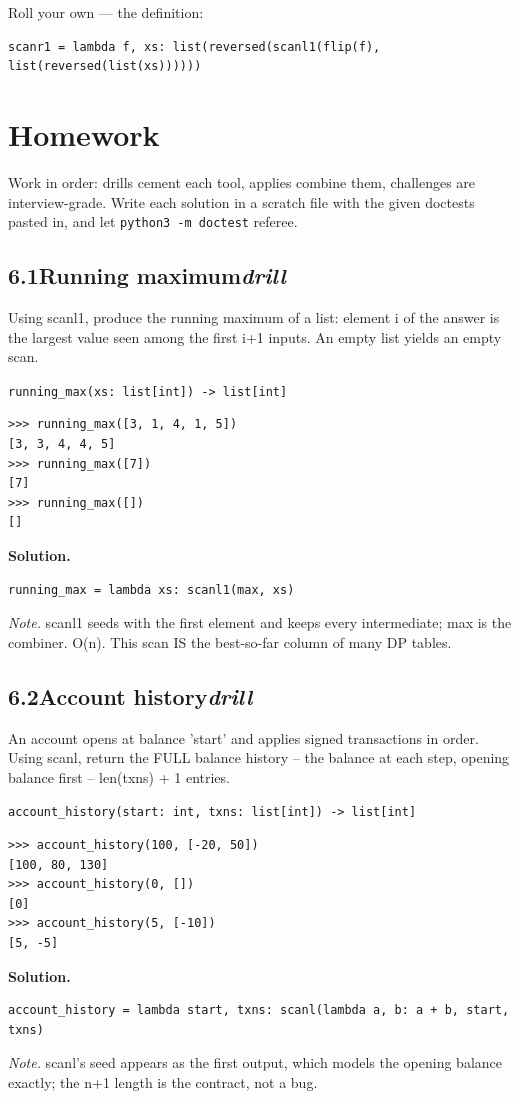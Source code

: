 \documentclass[10pt,letterpaper]{book}
\begin{document}
Roll your own --- the definition:

\begin{lstlisting}[style=ex]
scanr1 = lambda f, xs: list(reversed(scanl1(flip(f), list(reversed(list(xs))))))
\end{lstlisting}

\section{Homework}
Work in order: drills cement each tool, applies combine them,
challenges are interview-grade. Write each solution in a scratch file with
the given doctests pasted in, and let \texttt{python3 -m doctest} referee.
\subsection*{6.1\quad Running maximum\hfill\textnormal{\textit{drill}}}
Using scanl1, produce the running maximum of a list: element i of the answer is the largest value seen among the first i+1 inputs. An empty list yields an empty scan.

\noindent\texttt{running\_max(xs: list[int]) -> list[int]}
\begin{lstlisting}[style=ex]
>>> running_max([3, 1, 4, 1, 5])
[3, 3, 4, 4, 5]
>>> running_max([7])
[7]
>>> running_max([])
[]
\end{lstlisting}
\noindent\textbf{Solution.}
\begin{lstlisting}[style=code]
running_max = lambda xs: scanl1(max, xs)
\end{lstlisting}
\noindent\textit{Note.} scanl1 seeds with the first element and keeps every intermediate; max is the combiner. O(n). This scan IS the best-so-far column of many DP tables.

\subsection*{6.2\quad Account history\hfill\textnormal{\textit{drill}}}
An account opens at balance 'start' and applies signed transactions in order. Using scanl, return the FULL balance history -- the balance at each step, opening balance first -- len(txns) + 1 entries.

\noindent\texttt{account\_history(start: int, txns: list[int]) -> list[int]}
\begin{lstlisting}[style=ex]
>>> account_history(100, [-20, 50])
[100, 80, 130]
>>> account_history(0, [])
[0]
>>> account_history(5, [-10])
[5, -5]
\end{lstlisting}
\noindent\textbf{Solution.}
\begin{lstlisting}[style=code]
account_history = lambda start, txns: scanl(lambda a, b: a + b, start, txns)
\end{lstlisting}
\noindent\textit{Note.} scanl's seed appears as the first output, which models the opening balance exactly; the n+1 length is the contract, not a bug.
\end{document}
